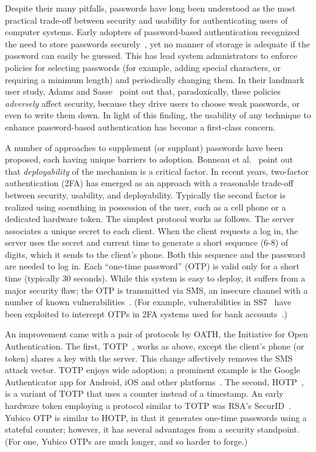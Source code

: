 %
%
\label{sec:related}

Despite their many pitfalls, passwords have long been understood as the most
practical trade-off between security and usability for authenticating users of
computer systems.
%
Early adopters of password-based authentication recognized the need to store
passwords securely~\cite{morris1979password}, yet no manner of storage is
adequate if the password can easily be guessed. This has lead system
admnistrators to enforce policies for selecting passwords (for example, adding
special characters, or requiring a minimum length) and periodically changing
them.  In their landmark user study, Adams and Sasse~\cite{adams1999users} point
out that, paradoxically, these policies \emph{adversely} affect security,
because they drive users to choose weak passwords, or even to write them down.
In light of this finding, the usability of any technique to enhance
password-based authentication has become a first-class concern.

A number of approaches to supplement (or supplant) passwords have been proposed,
each having unique barriers to adoption. Bonneau et al.~\cite{bonneau2012quest}
point out that \emph{deployability} of the mechanism is a critical factor.
%
In recent years, two-factor authentication (2FA) has emerged as an approach with
a reasonable trade-off between security, usability, and deployability.
Typically the second factor is realized using soemthing in possession of the
user, such as a cell phone or a dedicated hardware token.
%
The simplest protocol works as follows. The server associates a unique secret to
each client. When the client requests a log in, the server uses the secret and
current time to generate a short sequence (6-8) of digits, which it sends to the
client's phone. Both this sequence and the password are needed to log in. Each
``one-time password'' (OTP) is valid only for a short time (typically 30
seconds). While this system is easy to deploy, it suffers from a major security
flaw; the OTP is transmitted via SMS, an insecure channel with a number of known
vulnerabilities~\cite{reaves2016sending}. (For example, vulnerabilities in
SS7~\cite{engel2008locating} have been exploited to intercept OTPs in 2FA
systems used for bank accounts~\cite{schwachstelle}.)

An improvement came with a pair of protocols by OATH, the Initiative for Open
Authentication. The first, TOTP~\cite{rfc6238}, works as above, except the
client's phone (or token) shares a key with the server. This change affectively
removes the SMS attack vector.
%
TOTP enjoys wide adoption; a prominent example is the Google Authenticator app
for Android, iOS and other platforms~\cite{googleauth}. The second,
HOTP~\cite{rfc4226}, is a variant of TOTP that uses a counter instead of a
timestamp.
%
An early hardware token employing a protocol similar to TOTP was RSA's
SecurID~\cite{securid}.
%
Yubico OTP is similar to HOTP, in that it generates one-time passwords using a
stateful counter; however, it has several advantages from a security standpoint.
(For one, Yubico OTPs are much longer, and so harder to forge.)


